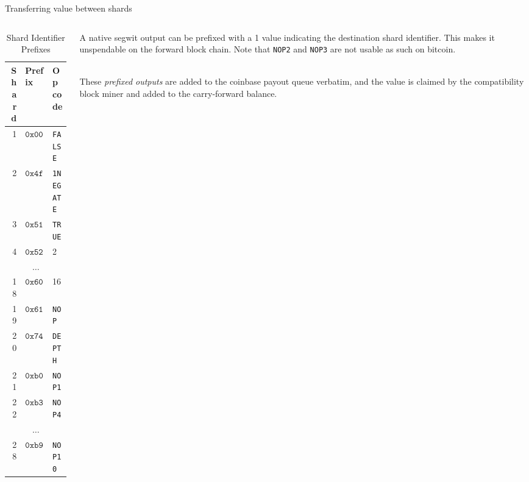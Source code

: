 \documentclass[10pt]{beamer}
\begin{document}
\begin{frame}{Transferring value between shards}

  \begin{columns}

    \begin{column}{0.5\textwidth}

      \begin{table} \center
        \caption{Shard Identifier Prefixes}
        \label{shardprefix}
        \begin{tabular}{r l l}
          \toprule
          Shard & Prefix & Opcode\\
          \midrule
          1   &  $\mathtt{0x00}$  &  {\tt FALSE}\\
          2   &  $\mathtt{0x4f}$  &  {\tt 1NEGATE}\\
          3   &  $\mathtt{0x51}$  &  {\tt TRUE}\\
          4   &  $\mathtt{0x52}$  &  \num{2}\\
          \multicolumn{3}{c}{$\dots$}\\
          18  &  $\mathtt{0x60}$  &  \num{16}\\
          19  &  $\mathtt{0x61}$  &  {\tt NOP}\\
          20  &  $\mathtt{0x74}$  &  {\tt DEPTH}\\
          21  &  $\mathtt{0xb0}$  &  {\tt NOP1}\\
          22  &  $\mathtt{0xb3}$  &  {\tt NOP4}\\
          \multicolumn{3}{c}{$\dots$}\\
          28  &  $\mathtt{0xb9}$  &  {\tt NOP10}\\
          \bottomrule
        \end{tabular}
      \end{table}

    \end{column}

    \begin{column}{0.5\textwidth}

      A native segwit output can be prefixed with a \SI{1}{\byte}
      value indicating the destination shard identifier.  This makes
      it unspendable on the forward block chain.  Note that {\tt NOP2}
      and {\tt NOP3} are not usable as such on bitcoin.\\~\

      These \emph{prefixed outputs} are added to the coinbase payout
      queue verbatim, and the value is claimed by the compatibility
      block miner and added to the carry-forward balance.

    \end{column}

  \end{columns}

\end{frame}
\end{document}
